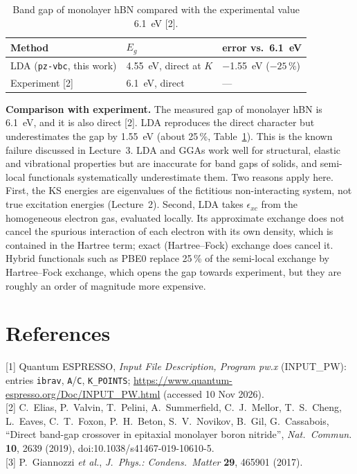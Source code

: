 \documentclass[11pt,a4paper]{article}
\begin{document}
\begin{table}[htb]
\centering
\caption{Band gap of monolayer hBN compared with the experimental value \SI{6.1}{eV} [2].}
\label{tab:compare}
\small
\begin{tabular}{l l l}
\toprule
Method & $E_g$ & error vs.\ \SI{6.1}{eV} \\
\midrule
LDA (\texttt{pz-vbc}, this work) & \SI{4.55}{eV}, direct at $K$ & \SI{-1.55}{eV} ($-25\,\%$) \\
Experiment [2]                   & \SI{6.1}{eV}, direct         & --- \\
\bottomrule
\end{tabular}
\end{table}

\textbf{Comparison with experiment.} The measured gap of monolayer hBN is \SI{6.1}{eV}, and it is also direct [2]. LDA reproduces the
direct character but underestimates the gap by \SI{1.55}{eV} (about 25\,\%, Table~\ref{tab:compare}). This is the known failure discussed in Lecture~3.
LDA and GGAs work well for structural, elastic and vibrational properties but are inaccurate for band gaps of solids, and
semi-local functionals systematically underestimate them. Two reasons apply here. First, the KS energies are eigenvalues of the
fictitious non-interacting system, not true excitation energies (Lecture~2). Second, LDA takes $\epsilon_{xc}$ from the
homogeneous electron gas, evaluated locally. Its approximate exchange does not cancel the spurious interaction of each electron with its own
density, which is contained in the Hartree term; exact (Hartree--Fock) exchange does cancel it. Hybrid functionals such as PBE0 replace 25\,\% of the
semi-local exchange by Hartree--Fock exchange, which opens the gap towards experiment, but they are roughly an order of magnitude more expensive.

\section*{References}
{\small
[1] Quantum ESPRESSO, \emph{Input File Description, Program pw.x} (INPUT\_PW): entries \texttt{ibrav}, \texttt{A}/\texttt{C},
\texttt{K\_POINTS}; \url{https://www.quantum-espresso.org/Doc/INPUT_PW.html} (accessed 10 Nov 2026).\\
{[2]} C.~Elias, P.~Valvin, T.~Pelini, A.~Summerfield, C.~J.~Mellor, T.~S.~Cheng, L.~Eaves, C.~T.~Foxon, P.~H.~Beton, S.~V.~Novikov,
B.~Gil, G.~Cassabois, ``Direct band-gap crossover in epitaxial monolayer boron nitride'', \emph{Nat.\ Commun.} \textbf{10}, 2639 (2019),
doi:10.1038/s41467-019-10610-5.\\
{[3]} P.~Giannozzi \emph{et al.}, \emph{J.\ Phys.: Condens.\ Matter} \textbf{29}, 465901 (2017).\par}
\end{document}
